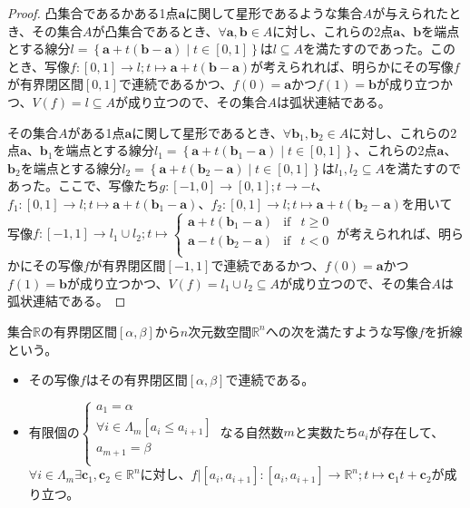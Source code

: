 \documentclass[dvipdfmx]{jsarticle}
\begin{document}
\begin{proof}
凸集合であるかある1点$\mathbf{a}$に関して星形であるような集合$A$が与えられたとき、その集合$A$が凸集合であるとき、$\forall\mathbf{a},\mathbf{b} \in A$に対し、これらの2点$\mathbf{a}$、$\mathbf{b}$を端点とする線分$l = \left\{ \mathbf{a} + t\left( \mathbf{b} - \mathbf{a} \right) \middle| t \in [ 0,1] \right\}$は$l \subseteq A$を満たすのであった。このとき、写像$f:[ 0,1] \rightarrow l;t \mapsto \mathbf{a} + t\left( \mathbf{b} - \mathbf{a} \right)$が考えられれば、明らかにその写像$f$が有界閉区間$[ 0,1]$で連続であるかつ、$f(0) = \mathbf{a}$かつ$f(1) = \mathbf{b}$が成り立つかつ、$V(f) = l \subseteq A$が成り立つので、その集合$A$は弧状連結である。\par
その集合$A$がある1点$\mathbf{a}$に関して星形であるとき、$\forall\mathbf{b}_{1},\mathbf{b}_{2} \in A$に対し、これらの2点$\mathbf{a}$、$\mathbf{b}_{1}$を端点とする線分$l_{1} = \left\{ \mathbf{a} + t\left( \mathbf{b}_{1} - \mathbf{a} \right) \middle| t \in [ 0,1] \right\}$、これらの2点$\mathbf{a}$、$\mathbf{b}_{2}$を端点とする線分$l_{2} = \left\{ \mathbf{a} + t\left( \mathbf{b}_{2} - \mathbf{a} \right) \middle| t \in [ 0,1] \right\}$は$l_{1},l_{2} \subseteq A$を満たすのであった。ここで、写像たち$g:[ - 1,0] \rightarrow [ 0,1];t \rightarrow - t$、$f_{1}:[ 0,1] \rightarrow l;t \mapsto \mathbf{a} + t\left( \mathbf{b}_{1} - \mathbf{a} \right)$、$f_{2}:[ 0,1] \rightarrow l;t \mapsto \mathbf{a} + t\left( \mathbf{b}_{2} - \mathbf{a} \right)$を用いて写像$f:[ - 1,1] \rightarrow l_{1} \cup l_{2};t \mapsto \left\{ \begin{matrix}
\mathbf{a} + t\left( \mathbf{b}_{1} - \mathbf{a} \right) & \mathrm{if} & t \geq 0 \\
\mathbf{a} - t\left( \mathbf{b}_{2} - \mathbf{a} \right) & \mathrm{if} & t < 0 \\
\end{matrix} \right.\ $が考えられれば、明らかにその写像$f$が有界閉区間$[ - 1,1]$で連続であるかつ、$f(0) = \mathbf{a}$かつ$f(1) = \mathbf{b}$が成り立つかつ、$V(f) = l_{1} \cup l_{2} \subseteq A$が成り立つので、その集合$A$は弧状連結である。
\end{proof}
\begin{dfn}
集合$\mathbb{R}$の有界閉区間$[\alpha,\beta]$から$n$次元数空間$\mathbb{R}^{n}$への次を満たすような写像$f$を折線という。
\begin{itemize}
\item
  その写像$f$はその有界閉区間$[\alpha,\beta]$で連続である。
\item
  有限個の$\left\{ \begin{matrix}
  a_{1} = \alpha \\
  \forall i \in \varLambda_{m}\left[ a_{i} \leq a_{i + 1} \right] \\
  a_{m + 1} = \beta \\
  \end{matrix} \right.\ $なる自然数$m$と実数たち$a_{i}$が存在して、$\forall i \in \varLambda_{m}\exists\mathbf{c}_{1},\mathbf{c}_{2} \in \mathbb{R}^{n}$に対し、$f|\left[ a_{i},a_{i + 1} \right]:\left[ a_{i},a_{i + 1} \right] \rightarrow \mathbb{R}^{n};t \mapsto \mathbf{c}_{1}t + \mathbf{c}_{2}$が成り立つ。
\end{itemize}
\end{dfn}
\end{document}
